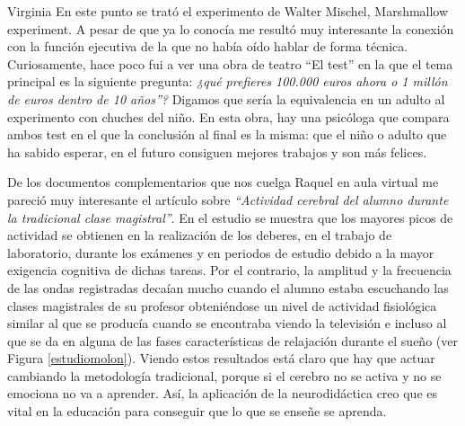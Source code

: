 \begin{opin}{\virgicolor}{Virginia}
En este punto se trató el experimento de Walter Mischel, Marshmallow experiment. A pesar de que ya lo conocía me resultó muy interesante la conexión con la función ejecutiva de la que no había oído hablar de forma técnica. Curiosamente, hace poco fui a ver una obra de teatro “El test” en la que el tema principal es la siguiente pregunta: \textit{¿qué prefieres 100.000 euros ahora o 1 millón de euros dentro de 10 años”?} Digamos que sería la equivalencia en un adulto al experimento con chuches del niño. En esta obra, hay una psicóloga que compara ambos test en el que la conclusión al final es la misma: que el niño o adulto que ha sabido esperar, en el futuro consiguen mejores trabajos y son más felices.



De los documentos complementarios que nos cuelga Raquel en aula virtual me pareció muy interesante el artículo sobre \textit{“Actividad cerebral del alumno durante la tradicional clase magistral”}.
En el estudio se muestra que los mayores picos de actividad se obtienen en la realización de los deberes, en el trabajo de laboratorio, durante los exámenes y en periodos de estudio debido a la mayor exigencia cognitiva de dichas tareas. Por el contrario, la amplitud y la frecuencia de las ondas registradas decaían mucho cuando el alumno estaba escuchando las clases magistrales de su profesor obteniéndose un nivel de actividad fisiológica similar al que se producía cuando se encontraba viendo la televisión e incluso al que se da en alguna de las fases características de relajación durante el sueño (ver Figura \ref{estudiomolon}). Viendo estos resultados está claro que hay que actuar cambiando la metodología tradicional, porque si el cerebro no se activa y no se emociona no va a aprender. Así, la aplicación de la neurodidáctica creo que es vital en la educación para conseguir que lo que se enseñe se aprenda.





\end{opin}
